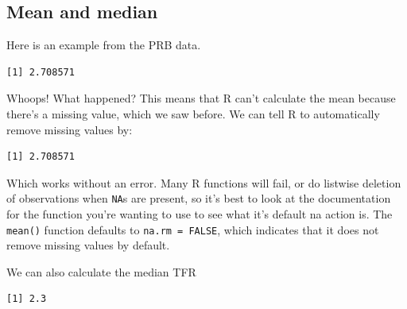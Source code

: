 \documentclass[
  letterpaper,
  DIV=11,
  numbers=noendperiod]{scrreprt}
\newenvironment{Shaded}{\begin{snugshade}}{\end{snugshade}}
\newcommand{\AttributeTok}[1]{\textcolor[rgb]{0.40,0.45,0.13}{#1}}
\newcommand{\ConstantTok}[1]{\textcolor[rgb]{0.56,0.35,0.01}{#1}}
\newcommand{\FunctionTok}[1]{\textcolor[rgb]{0.28,0.35,0.67}{#1}}
\newcommand{\NormalTok}[1]{\textcolor[rgb]{0.00,0.23,0.31}{#1}}
\newcommand{\SpecialCharTok}[1]{\textcolor[rgb]{0.37,0.37,0.37}{#1}}
\begin{document}
\hypertarget{mean-and-median}{%
\subsection{Mean and median}\label{mean-and-median}}

Here is an example from the PRB data.

\begin{Shaded}
\end{Shaded}

\begin{verbatim}
[1] 2.708571
\end{verbatim}

Whoops! What happened? This means that R can't calculate the mean
because there's a missing value, which we saw before. We can tell R to
automatically remove missing values by:

\begin{Shaded}
\end{Shaded}

\begin{verbatim}
[1] 2.708571
\end{verbatim}

Which works without an error. Many R functions will fail, or do listwise
deletion of observations when \texttt{NA}s are present, so it's best to
look at the documentation for the function you're wanting to use to see
what it's default na action is. The \texttt{mean()} function defaults to
\texttt{na.rm\ =\ FALSE}, which indicates that it does not remove
missing values by default.

We can also calculate the median TFR

\begin{Shaded}
\end{Shaded}

\begin{verbatim}
[1] 2.3
\end{verbatim}
\end{document}
